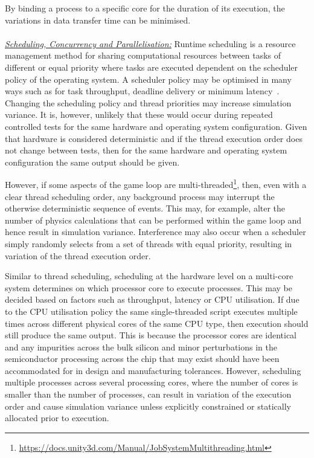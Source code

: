 \documentclass[letterpaper, 10 pt, journal, twoside]{IEEEtran}
\begin{document}
%
By binding a process to a specific core for the duration of its execution, the variations in data transfer time can be minimised.
\\\\
\noindent\underline{\textit{Scheduling, Concurrency and Parallelisation:}}
Runtime scheduling is a resource management method for sharing computational resources between tasks of different or equal priority where tasks are executed dependent on the scheduler policy of the operating system. A scheduler policy may be optimised in many ways such as for task throughput, deadline delivery or minimum latency~\cite{liu1973scheduling}. 
%
Changing the scheduling policy and thread priorities may increase simulation variance. 
%
It is, however, unlikely that these would occur during repeated controlled tests for the same hardware and operating system configuration. Given that hardware is considered deterministic and if the thread execution order does not change between tests, then for the same hardware and operating system configuration the same output should be given. 

However, if some aspects of the game loop are multi-threaded\footnote{\url{https://docs.unity3d.com/Manual/JobSystemMultithreading.html}}, then, even with a clear thread scheduling order, any background process may interrupt the otherwise deterministic sequence of events. This may, for example, alter the number of physics calculations that can be performed within the game loop and hence result in simulation variance.
%
Interference may also occur when a scheduler simply randomly selects from a set of threads with equal priority, resulting in variation of the thread execution order.

Similar to thread scheduling, scheduling at the hardware level on a multi-core system determines on which processor core to execute processes. This may be decided based on factors such as throughput, latency or CPU utilisation. 
%
If due to the CPU utilisation policy the same single-threaded script executes multiple times across different physical cores of the same CPU type,  then execution should still produce the same output. 
%
This is because the processor cores are identical and any impurities across the bulk silicon and minor perturbations in the semiconductor processing across the chip that may exist should have been accommodated for in design and manufacturing tolerances.
%
However, scheduling multiple processes across several processing cores, where the number of cores is smaller than the number of processes, can result in variation of the execution order and cause simulation variance unless explicitly constrained or statically allocated prior to execution.
\end{document}
